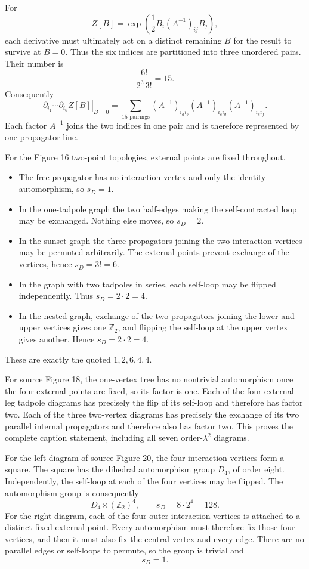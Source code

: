 \begin{enumerate}
For
\[
 Z[B]=\exp\!\left(\frac12B_i(A^{-1})_{ij}B_j\right),
\]
each derivative must ultimately act on a distinct remaining \(B\) for
the result to survive at \(B=0\).  Thus the six indices are partitioned
into three unordered pairs.  Their number is
\[
 \frac{6!}{2^3\,3!}=15.
\]
Consequently
\[
 \left.\partial_{i_1}\cdots\partial_{i_6}Z[B]\right|_{B=0}
 =\sum_{\text{15 pairings}}
 (A^{-1})_{i_ai_b}(A^{-1})_{i_ci_d}(A^{-1})_{i_ei_f}.
\]
Each factor \(A^{-1}\) joins the two indices in one pair and is therefore
represented by one propagator line.

For the Figure 16 two-point topologies, external points are fixed throughout.

\begin{itemize}
\item The free propagator has no interaction vertex and only the identity
automorphism, so \(s_D=1\).
\item In the one-tadpole graph the two half-edges making the self-contracted
loop may be exchanged.  Nothing else moves, so \(s_D=2\).
\item In the sunset graph the three propagators joining the two interaction
vertices may be permuted arbitrarily.  The external points prevent exchange
of the vertices, hence \(s_D=3!=6\).
\item In the graph with two tadpoles in series, each self-loop may be flipped
independently.  Thus \(s_D=2\cdot2=4\).
\item In the nested graph, exchange of the two propagators joining the lower
and upper vertices gives one \(\mathbb Z_2\), and flipping the self-loop at
the upper vertex gives another.  Hence \(s_D=2\cdot2=4\).
\end{itemize}
These are exactly the quoted \(1,2,6,4,4\).

For source Figure 18, the one-vertex tree has no nontrivial automorphism once
the four external points are fixed, so its factor is one.  Each of the four
external-leg tadpole diagrams has precisely the flip of its self-loop and
therefore has factor two.  Each of the three two-vertex diagrams has precisely
the exchange of its two parallel internal propagators and therefore also has
factor two.  This proves the complete caption statement, including all seven
order-\(\lambda^2\) diagrams.

For the left diagram of source Figure 20, the four interaction vertices form
a square.  The square has the dihedral automorphism group \(D_4\), of order
eight.  Independently, the self-loop at each of the four vertices may be
flipped.  The automorphism group is consequently
\[
 D_4\ltimes(\mathbb Z_2)^4,
 \qquad s_D=8\cdot2^4=128.
\]
For the right diagram, each of the four outer interaction vertices is attached
to a distinct fixed external point.  Every automorphism must therefore fix
those four vertices, and then it must also fix the central vertex and every
edge.  There are no parallel edges or self-loops to permute, so the group is
trivial and
\[
 s_D=1.
\]


\end{enumerate}
